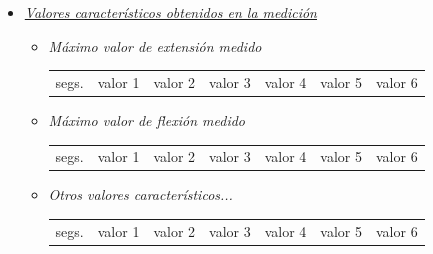 \begin{itemize} [label=]
\begin{itemize} [label=$ \rhd $]
		\item \textit{\underline{Valores característicos obtenidos en la medición}}
		\begin{itemize} [label= $  \triangleright $] \addtolength{\itemsep}{-5mm} %
			\item \textit{Máximo valor de extensión medido} \vspace{-6mm}
			\begin{table}[H]
				\hspace{2cm}
				\renewcommand{\arraystretch}{2}
				\begin{tabular}{ccccccc}
					segs.& valor 1 & valor 2 & valor 3 & valor 4 & valor 5 & valor 6  \\
				\end{tabular} 
			\end{table}	
			\item \textit{Máximo valor de flexión medido} \vspace{-6mm}
			\begin{table}[H]
				\hspace{2cm}
				\renewcommand{\arraystretch}{2}
				\begin{tabular}{ccccccc}
					segs.& valor 1 & valor 2 & valor 3 & valor 4 & valor 5 & valor 6  \\
				\end{tabular} 
			\end{table}	
			\item \textit{Otros valores característicos...} \vspace{-6mm}	
			\begin{table}[H]
				\hspace{2cm}
				\renewcommand{\arraystretch}{2}
				\begin{tabular}{ccccccc}
					segs.& valor 1 & valor 2 & valor 3 & valor 4 & valor 5 & valor 6  \\
				\end{tabular} 
			\end{table}	
		\end{itemize}
		

\end{itemize}
\end{itemize}
